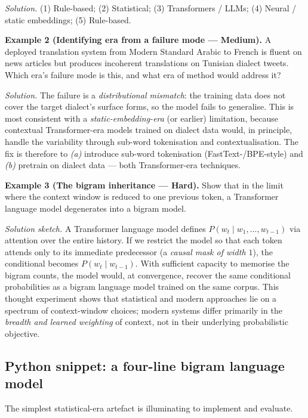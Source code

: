 \documentclass[12pt,a4paper]{report}
\theoremstyle{definition}
\theoremstyle{remark}
\begin{document}
\textit{Solution.} (1) Rule-based; (2) Statistical; (3) Transformers / LLMs; (4) Neural / static embeddings; (5) Rule-based.

\medskip

\textbf{Example 2 (Identifying era from a failure mode --- Medium).}
A deployed translation system from Modern Standard Arabic to French is fluent on news articles but produces incoherent translations on Tunisian dialect tweets. Which era's failure mode is this, and what era of method would address it?

\textit{Solution.} The failure is a \emph{distributional mismatch}: the training data does not cover the target dialect's surface forms, so the model fails to generalise. This is most consistent with a \emph{static-embedding-era} (or earlier) limitation, because contextual Transformer-era models trained on dialect data would, in principle, handle the variability through sub-word tokenisation and contextualisation. The fix is therefore to \emph{(a)} introduce sub-word tokenisation (FastText-/BPE-style) and \emph{(b)} pretrain on dialect data --- both Transformer-era techniques.

\medskip

\textbf{Example 3 (The bigram inheritance --- Hard).}
Show that in the limit where the context window is reduced to one previous token, a Transformer language model degenerates into a bigram model.

\textit{Solution sketch.} A Transformer language model defines $P(w_t \mid w_1, \dots, w_{t-1})$ via attention over the entire history. If we restrict the model so that each token attends only to its immediate predecessor (a \emph{causal mask of width $1$}), the conditional becomes $P(w_t \mid w_{t-1})$. With sufficient capacity to memorise the bigram counts, the model would, at convergence, recover the same conditional probabilities as a bigram language model trained on the same corpus. This thought experiment shows that statistical and modern approaches lie on a spectrum of context-window choices; modern systems differ primarily in the \emph{breadth and learned weighting} of context, not in their underlying probabilistic objective.

\subsection{Python snippet: a four-line bigram language model}

The simplest statistical-era artefact is illuminating to implement and evaluate.
\end{document}
